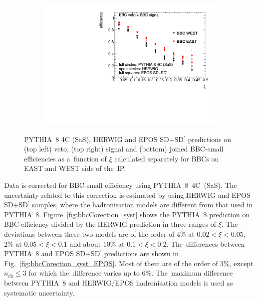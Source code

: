 \begin{figure}[t!]
\begin{subfigure}{.45\textwidth}
	\end{subfigure}
	\begin{subfigure}{.45\textwidth}
		\includegraphics[width=\textwidth,page=1]{chapters/chrgSTAR/img/bbcCorrection/xiSD_bbc.pdf}
	\end{subfigure}
	\begin{minipage}{.45\textwidth}
		\caption{PYTHIA~8 4C (SaS), HERWIG and EPOS SD+SD$^\prime$ predictions on  (top left) veto, (top right) signal and (bottom) joined BBC-small efficiencies  as a~function of  $\xi$ calculated separately for BBCs on EAST and WEST side of the~IP.}
		\label{fig:bbcAcceptance}
	\end{minipage}
	
\end{figure}

Data is corrected for BBC-small efficiency using PYTHIA~8~4C~(SaS).  The uncertainty related to this correction is  estimated by using HERWIG and EPOS SD+SD$^\prime$ samples, where the hadronisation models are different from that used in PYTHIA~8. Figure~\ref{fig:bbcCorection_syst} shows the PYTHIA~8  prediction on BBC efficiency  divided by the HERWIG prediction in three ranges of $\xi$. The deviations between these two models are of the order of $4\%$ at $0.02<\xi<0.05$, $2\%$ at $0.05<\xi<0.1$ and about $10\%$ at  $0.1<\xi<0.2$. The~differences between PYTHIA~8 and EPOS SD+SD$^\prime$ predictions are shown in Fig.~\ref{fig:bbcCorection_syst_EPOS}. Most of them are of the order of $3\%$, except $n_\textrm{ch}\leq 3$ for which the~difference varies up to $6\%$. The~maximum difference between PYTHIA~8 and HERWIG/EPOS hadronisation models is used as systematic uncertainty. 

